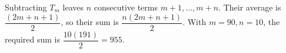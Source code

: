 Subtracting $T_m$ leaves $n$ consecutive terms $m+1,\ldots,m+n$. Their average is $\dfrac{(2m+n+1)}{2}$, so their sum is $\dfrac{n(2m+n+1)}{2}$. With $m=90,n=10$, the required sum is $\dfrac{10(191)}{2}=\boxed{955}$.
